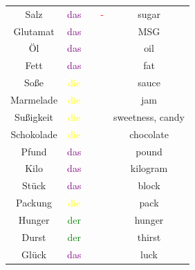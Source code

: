 \begin{center}
\begin{longtable} {|c|c|c|c|c|}
        Salz                  & \textcolor{purple}{das} &          & \textcolor{red}{-}                      & sugar                  \\
        Glutamat              & \textcolor{purple}{das} &          &                                         & MSG                    \\
        Öl                    & \textcolor{purple}{das} &          &                                         & oil                    \\
        Fett                  & \textcolor{purple}{das} &          &                                         & fat                    \\
        Soße                  & \textcolor{yellow}{die} &          &                                         & sauce                  \\
        Marmelade             & \textcolor{yellow}{die} &          &                                         & jam                    \\
        \hline
        Sußigkeit             & \textcolor{yellow}{die} &          &                                         & sweetness, candy       \\
        Schokolade            & \textcolor{yellow}{die} &          &                                         & chocolate              \\
        \hline
        Pfund                 & \textcolor{purple}{das} &          &                                         & pound                  \\
        Kilo                  & \textcolor{purple}{das} &          &                                         & kilogram               \\
        Stück                 & \textcolor{purple}{das} &          &                                         & block                  \\
        Packung               & \textcolor{yellow}{die} &          &                                         & pack                   \\
        \hline
        Hunger                & \textcolor{green}{der}  &          &                                         & hunger                 \\
        Durst                 & \textcolor{green}{der}  &          &                                         & thirst                 \\
        Glück                 & \textcolor{purple}{das} &          &                                         & luck                   \\

\end{longtable}
\end{center}
